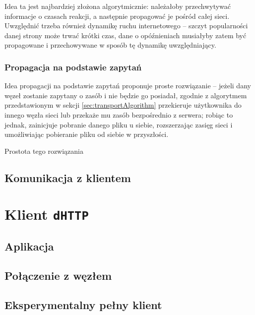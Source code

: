 Idea ta jest najbardziej złożona algorytmicznie: należałoby przechwytywać informacje o czasach reakcji, a następnie propagować je pośród całej sieci. Uwzględnić trzeba również dynamikę ruchu internetowego -- szczyt popularności danej strony może trwać krótki czas, dane o opóźnieniach musiałyby zatem być propagowane i przechowywane w sposób tę dynamikę uwzględniający.

\subsubsection{Propagacja na podstawie zapytań}
Idea propagacji na podstawie zapytań proponuje proste rozwiązanie -- jeżeli dany węzeł zostanie zapytany o zasób i nie będzie go posiadał, zgodnie z algorytmem przedstawionym w sekcji \ref{sec:transportAlgorithm} przekieruje użytkownika do innego węzła sieci lub przekaże mu zasób bezpośrednio z serwera; robiąc to jednak, zainicjuje pobranie danego pliku u siebie, rozszerzając zasięg sieci i umożliwiając pobieranie pliku od siebie w przyszłości.

Prostota tego rozwiązania


\subsection{Komunikacja z klientem}



\section{Klient \texttt{dHTTP}}
\subsection{Aplikacja}
\subsection{Połączenie z węzłem}
\subsection{Eksperymentalny pełny klient}




